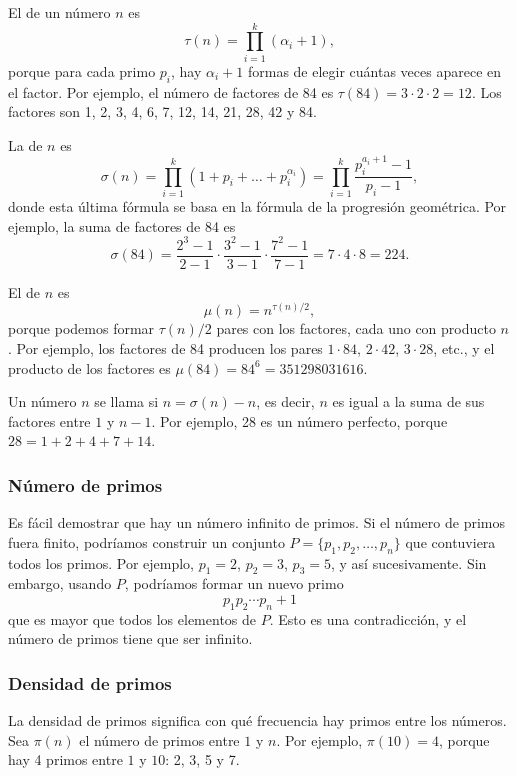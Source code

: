 El  de un número $n$ es
\[\tau(n)=\prod_{i=1}^k (\alpha_i+1),\]
porque para cada primo $p_i$, hay
$\alpha_i+1$ formas de elegir cuántas veces
aparece en el factor.
Por ejemplo, el número de factores
de 84 es
$\tau(84)=3 \cdot 2 \cdot 2 = 12$.
Los factores son
1, 2, 3, 4, 6, 7, 12, 14, 21, 28, 42 y 84.

La  de $n$ es
\[\sigma(n)=\prod_{i=1}^k (1+p_i+\ldots+p_i^{\alpha_i}) = \prod_{i=1}^k \frac{p_i^{a_i+1}-1}{p_i-1},\]
donde esta última fórmula se basa en la fórmula de la progresión geométrica.
Por ejemplo, la suma de factores de 84 es
\[\sigma(84)=\frac{2^3-1}{2-1} \cdot \frac{3^2-1}{3-1} \cdot \frac{7^2-1}{7-1} = 7 \cdot 4 \cdot 8 = 224.\]

El  de $n$ es
\[\mu(n)=n^{\tau(n)/2},\]
porque podemos formar $\tau(n)/2$ pares con los factores,
cada uno con producto $n$.
Por ejemplo, los factores de 84
producen los pares
$1 \cdot 84$, $2 \cdot 42$, $3 \cdot 28$, etc.,
y el producto de los factores es $\mu(84)=84^6=351298031616$.


Un número $n$ se llama  si $n=\sigma(n)-n$,
es decir, $n$ es igual a la suma de sus factores
entre $1$ y $n-1$.
Por ejemplo, 28 es un número perfecto,
porque $28=1+2+4+7+14$.

\subsubsection{Número de primos}

Es fácil demostrar que hay un número infinito
de primos.
Si el número de primos fuera finito,
podríamos construir un conjunto $P=\{p_1,p_2,\ldots,p_n\}$
que contuviera todos los primos.
Por ejemplo, $p_1=2$, $p_2=3$, $p_3=5$, y así sucesivamente.
Sin embargo, usando $P$, podríamos formar un nuevo primo
\[p_1 p_2 \cdots p_n+1\]
que es mayor que todos los elementos de $P$.
Esto es una contradicción, y el número de primos
tiene que ser infinito.

\subsubsection{Densidad de primos}

La densidad de primos significa con qué frecuencia hay primos
entre los números.
Sea $\pi(n)$ el número de primos entre
$1$ y $n$. Por ejemplo, $\pi(10)=4$, porque
hay 4 primos entre $1$ y $10$: 2, 3, 5 y 7.

